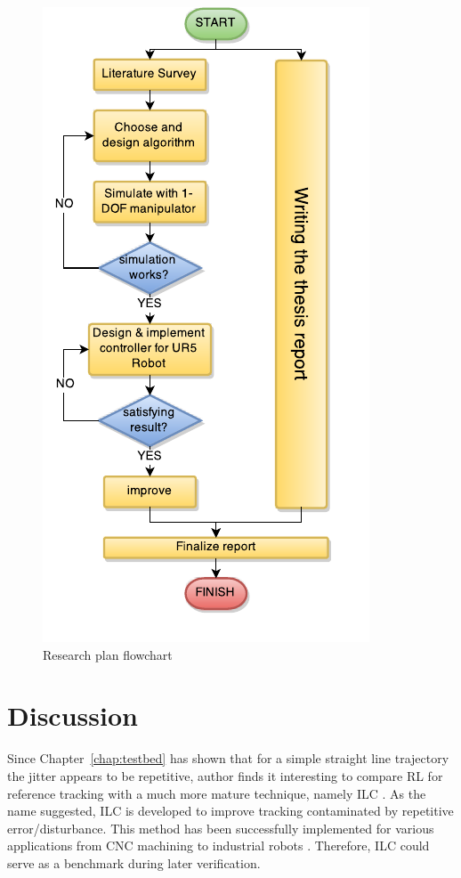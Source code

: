 \begin{figure}
\centering
\includegraphics[width=0.5\linewidth]{research_plan.pdf}
\caption{Research plan flowchart}
\label{fig:flowchart}
\end{figure}

\section{Discussion}\label{sec:discussion}
Since Chapter~\ref{chap:testbed} has shown that for a simple straight line trajectory the jitter appears to be repetitive, author finds it interesting to compare \acs{RL} for reference tracking with a much more mature technique, namely \acs{ILC} \cite{4048052}. As the name suggested, \acs {ILC} is developed to improve tracking contaminated by repetitive error/disturbance. This method has been successfully implemented for various applications from CNC machining \cite{299157} to industrial robots \cite{1044377}. Therefore, \acs {ILC} could serve as a benchmark during later verification.
